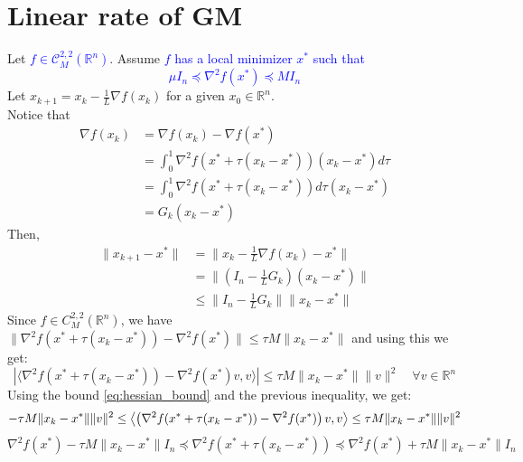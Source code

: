 \documentclass[12pt, openany]{report}
\newcommand{\R}{\mathbb{R}}
\newcommand{\C}{\mathcal{C}}
\theoremstyle{definition}
\begin{document}
\section{Linear rate of GM}
Let \textcolor{blue}{$f \in \C_M^{2,2}(\R^n)$}. Assume \textcolor{blue}{$f$ has a local minimizer $x^*$ such that 
\begin{equation}\label{eq:hessian_bound}
	\mu I_n \preceq \nabla^2 f(x^*) \preceq MI_n
\end{equation}}
Let $x_{k+1} = x_k - \frac{1}{L} \nabla f(x_k)$ for a given $x_0 \in \R^n$.\\
Notice that
\begin{equation}\label{eq:G_k}
	\begin{aligned}
		\nabla f(x_k) &= \nabla f(x_k) - \nabla f(x^*)\\
		&= \int_{0}^{1} \nabla^2 f(x^* + \tau(x_k-x^*)) (x_k-x^*) d\tau\\
		&= \int_{0}^{1} \nabla^2 f(x^* + \tau(x_k-x^*)) d\tau (x_k-x^*) \\
		&= G_k (x_k-x^*)
	\end{aligned}
\end{equation}
Then,
\begin{equation}
	\begin{aligned}
		\|x_{k+1} - x^*\| &= \|x_k - \frac{1}{L} \nabla f(x_k) - x^*\|\\
		&= \|(I_n-\frac{1}{L}G_k)(x_k-x^*)\|\\
		&\leq \|I_n - \frac{1}{L}G_k\| \|x_k-x^*\|
	\end{aligned}
\end{equation}
Since $f \in C_M^{2,2}(\R^n)$, we have $\|\nabla^2f(x^*+\tau(x_k-x^*))-\nabla^2f(x^*)\| \leq \tau M \|x_k -x^*\|$ and using this we get:
\begin{equation}
	|\langle \nabla^2f(x^*+\tau(x_k-x^*))-\nabla^2f(x^*) v, v\rangle| \leq \tau M \|x_k -x^*\| \|v\|^2 \quad \forall v \in \R^n
\end{equation}
Using the bound \eqref{eq:hessian_bound} and the previous inequality, we get:
\begin{equation*}
		-\tau M \|x_k -x^*\| \|v\|^2 \leq \left\langle \left(\nabla^2f(x^*+\tau(x_k-x^*))-\nabla^2f(x^*)\right) v, v\right\rangle \leq \tau M \|x_k -x^*\| \|v\|^2\\
\end{equation*}
\begin{equation*}
	\nabla^2 f(x^*) - \tau M \|x_k -x^*\| I_n \preceq \nabla^2f(x^*+\tau(x_k-x^*)) \preceq \nabla^2 f(x^*) + \tau M \|x_k -x^*\|I_n 
\end{equation*}
\end{document}
